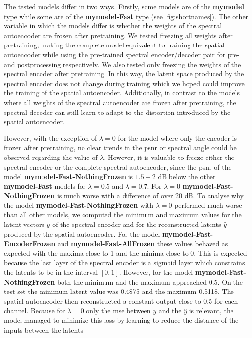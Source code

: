 The tested models differ in two ways. Firstly, some models are of the \textbf{\ac{mymodel}} type while some are of the \textbf{\ac{mymodel}-Fast} type (see \autoref{fig:shortnames}). The other variable in which the models differ is whether the weights of the spectral autoencoder are frozen after pretraining. We tested freezing all weights after pretraining, making the complete model equivalent to training the spatial autoencoder while using the pre-trained spectral encoder/decoder pair for pre- and postprocessing respectively. We also tested only freezing the weights of the spectral encoder after pretraining. In this way, the latent space produced by the spectral encoder does not change during training which we hoped could improve the training of the spatial autoencoder. Additionally, in contrast to the models where all weights of the spectral autoencoder are frozen after pretraining, the spectral decoder can still learn to adapt to the distortion introduced by the spatial autoencoder.

However, with the exception of $\lambda=0$ for the model where only the encoder is frozen after pretraining, no clear trends in the \ac{psnr} or spectral angle could be observed regarding the value of $\lambda$. However, it is valuable to freeze either the spectral encoder or the complete spectral autoencoder, since the \ac{psnr} of the model \textbf{\ac{mymodel}-Fast-NothingFrozen} is $1.5-2$ dB below the other \textbf{\ac{mymodel}-Fast} models for $\lambda = 0.5$ and $\lambda = 0.7$. For $\lambda=0$ \textbf{\ac{mymodel}-Fast-NothingFrozen} is much worse with a difference of over 20 dB. To analyse why the model \textbf{\ac{mymodel}-Fast-NothingFrozen} with $\lambda=0$ performed much worse than all other models, we computed the minimum and maximum values for the latent vectors $y$ of the spectral encoder and for the reconstructed latents $\hat{y}$ produced by the spatial autoencoder. For the model \textbf{\ac{mymodel}-Fast-EncoderFrozen} and \textbf{\ac{mymodel}-Fast-AllFrozen} these values behaved as expected with the maxima close to 1 and the minima close to 0. This is expected because the last layer of the spectral encoder is a sigmoid layer which constrains the latents to be in the interval $[0,1]$. However, for the model \textbf{\ac{mymodel}-Fast-NothingFrozen} both the minimum and the maximum approached 0.5. On the test set the minimum latent value was 0.4875 and the maximum 0.5118. The spatial autoencoder then reconstructed a constant output close to 0.5 for each channel. Because for $\lambda=0$ only the \ac{mse} between $y$ and the $\hat{y}$ is relevant, the model managed to minimize this loss by learning to reduce the distance of the inputs between the latents.

